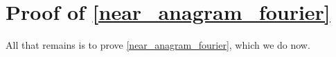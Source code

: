 \documentclass{patmorin}
\begin{document}
%



\section{Proof of \cref{near_anagram_fourier}}
\label{near_anagram_proof}


All that remains is to prove \cref{near_anagram_fourier}, which we do now.
\end{document}
